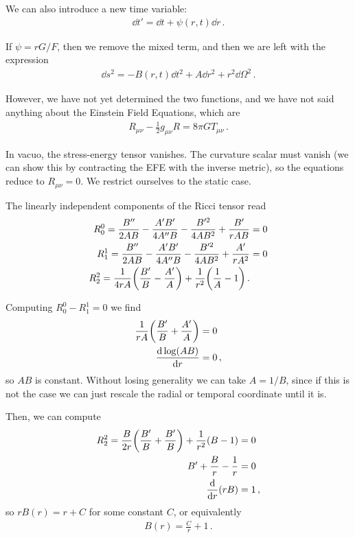 \documentclass[main.tex]{subfiles}
\begin{document}
We can also introduce a new time variable: 
%
\begin{align}
\dd{t'} = \dd{t} + \psi (r, t) \dd{r} 
\,.
\end{align}

If \(\psi = r G / F\), then we remove the mixed term, and then we are left with the expression 
%
\begin{align}
\dd{s^2} = -B (r, t) \dd{t^2} + A \dd{r^2} + r^2 \dd{\Omega^2}
\,.
\end{align}

However, we have not yet determined the two functions, and we have not said anything about the Einstein Field Equations, which are 
%
\begin{align}
R_{\mu \nu } - \frac{1}{2} g_{\mu \nu } R = 8 \pi G T_{\mu \nu }
\,.
\end{align}

In vacuo, the stress-energy tensor vanishes. 
The curvature scalar must vanish (we can show this by contracting the EFE with the inverse metric), so the equations reduce to \(R_{\mu \nu } = 0\). 
We restrict ourselves to the static case. 

The linearly independent components of the Ricci tensor read 
%
\begin{align}
R_{0}^{0} = \frac{B''}{2AB} - \frac{A' B'}{4 A'' B}
- \frac{B^{\prime 2}}{4AB^2} + \frac{B'}{rAB} &= 0 \\
R_{1}^{1} = \frac{B''}{2AB} - \frac{A' B'}{4 A'' B}
- \frac{B^{\prime 2}}{4AB^2} + \frac{A'}{rA^2} &= 0 \\ 
R_{2}^{2} = \frac{1}{4rA} \qty(\frac{B'}{B} - \frac{A'}{A})
+ \frac{1}{r^2} \qty( \frac{1}{A} - 1)
\,.
\end{align}

Computing \(R^{0}_{0} - R^{1}_{1} = 0\) we find 
%
\begin{align}
\frac{1}{rA} \qty(\frac{B'}{B} + \frac{A'}{A} )&= 0  \\
\dv{\log (AB)}{r} &= 0
\,,
\end{align}
%
so \(AB\) is constant.
Without losing generality we can take \(A = 1/B\), since if this is not the case we can just rescale the radial or temporal coordinate until it is.

Then, we can compute 
%
\begin{align}
R^{2}_{2} = \frac{B}{2r} \qty(\frac{B'}{B} + \frac{B'}{B}) + \frac{1}{r^2} (B-1) &= 0  \\
B' + \frac{B}{r} - \frac{1}{r} &= 0  \\
\dv{}{r} \qty(rB) &= 1
\,,
\end{align}
%
so \(r B(r) = r + C\) for some constant \(C\), or equivalently 
%
\begin{align}
B (r) = \frac{C}{r} + 1
\,.
\end{align}
\end{document}
